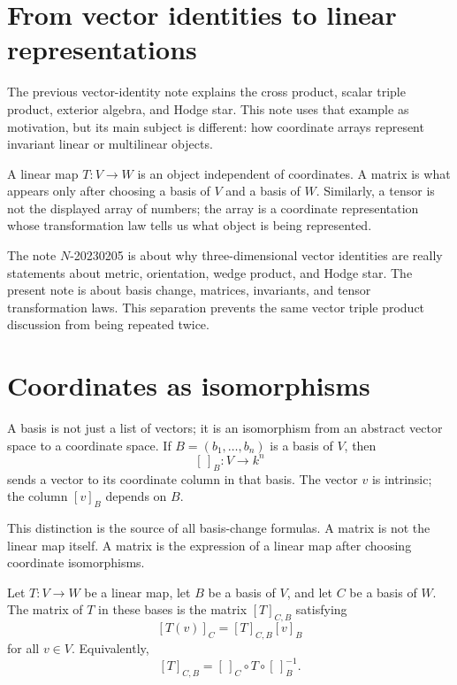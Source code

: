 
\section{From vector identities to linear representations}

The previous vector-identity note explains the cross product, scalar triple product, exterior algebra, and Hodge star.  This note uses that example as motivation, but its main subject is different: how coordinate arrays represent invariant linear or multilinear objects.

A linear map \(T:V\to W\) is an object independent of coordinates.  A matrix is what appears only after choosing a basis of \(V\) and a basis of \(W\).  Similarly, a tensor is not the displayed array of numbers; the array is a coordinate representation whose transformation law tells us what object is being represented.

\begin{remark}
The note \(N\)-20230205 is about why three-dimensional vector identities are really statements about metric, orientation, wedge product, and Hodge star.  The present note is about basis change, matrices, invariants, and tensor transformation laws.  This separation prevents the same vector triple product discussion from being repeated twice.
\end{remark}


\section{Coordinates as isomorphisms}

A basis is not just a list of vectors; it is an isomorphism from an abstract vector space to a coordinate space.  If \(B=(b_1,\ldots,b_n)\) is a basis of \(V\), then
\[
  [\,]_B:V\longrightarrow k^n
\]
sends a vector to its coordinate column in that basis.  The vector \(v\) is intrinsic; the column \([v]_B\) depends on \(B\).

This distinction is the source of all basis-change formulas.  A matrix is not the linear map itself.  A matrix is the expression of a linear map after choosing coordinate isomorphisms.

\begin{definition}
Let \(T:V\to W\) be a linear map, let \(B\) be a basis of \(V\), and let \(C\) be a basis of \(W\).  The matrix of \(T\) in these bases is the matrix \([T]_{C,B}\) satisfying
\[
  [T(v)]_C=[T]_{C,B}[v]_B
\]
for all \(v\in V\).  Equivalently,
\[
  [T]_{C,B}=[\,]_C\circ T\circ [\,]_B^{-1}.
\]
\end{definition}

